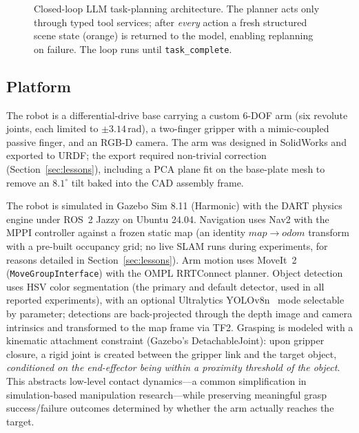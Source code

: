 \documentclass[conference]{IEEEtran}
\begin{document}
\begin{figure}[t]
\caption{Closed-loop LLM task-planning architecture. The planner acts only
through typed tool services; after \emph{every} action a fresh structured
scene state (orange) is returned to the model, enabling replanning on
failure. The loop runs until \texttt{task\_complete}.}
\label{fig:architecture}
\end{figure}

\subsection{Platform}

The robot is a differential-drive base carrying a custom 6-DOF arm (six
revolute joints, each limited to $\pm3.14$\,rad), a two-finger gripper with
a mimic-coupled passive finger, and an RGB-D camera. The arm was designed
in SolidWorks and exported to URDF; the export required non-trivial
correction (Section~\ref{sec:lessons}), including a PCA plane fit on the
base-plate mesh to remove an $8.1^{\circ}$ tilt baked into the CAD
assembly frame.

The robot is simulated in Gazebo Sim 8.11 (Harmonic) with the DART physics
engine under ROS~2 Jazzy on Ubuntu 24.04. Navigation uses Nav2 with the
MPPI controller against a frozen static map (an identity
$map \rightarrow odom$ transform with a pre-built occupancy grid; no live
SLAM runs during experiments, for reasons detailed in
Section~\ref{sec:lessons}). Arm motion uses MoveIt~2
(\texttt{MoveGroupInterface}) with the OMPL RRTConnect planner. Object
detection uses HSV color segmentation (the primary and default detector,
used in all reported experiments), with an optional Ultralytics
YOLOv8n~\cite{yolov8} mode selectable by parameter; detections are back-projected through the
depth image and camera intrinsics and transformed to the map frame via TF2.
Grasping is modeled with a kinematic attachment constraint (Gazebo's
DetachableJoint): upon gripper closure, a rigid joint is created between
the gripper link and the target object, \emph{conditioned on the
end-effector being within a proximity threshold of the object}. This
abstracts low-level contact dynamics---a common simplification in
simulation-based manipulation research---while preserving meaningful grasp
success/failure outcomes determined by whether the arm actually reaches the
target.
\end{document}
